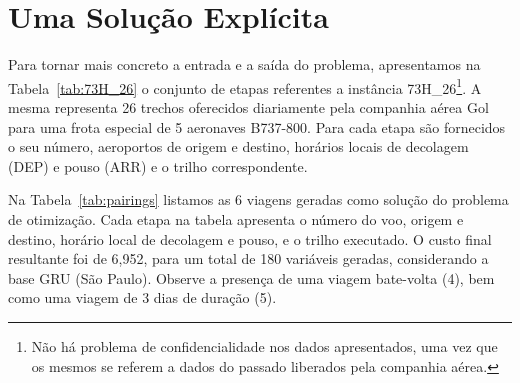
\section{Uma Solução Explícita}
\label{sec:solucao_explicita}

Para tornar mais concreto a entrada e a saída do problema, apresentamos na Tabela~\ref{tab:73H_26} o
conjunto de etapas referentes a instância 73H\_26\footnote{Não há problema de confidencialidade nos
dados apresentados, uma vez que os mesmos se referem a dados do passado liberados pela companhia
aérea.}. A mesma representa 26 trechos oferecidos diariamente pela companhia aérea Gol para uma
frota especial de 5 aeronaves B737-800. Para cada etapa são fornecidos o seu número, aeroportos de
origem e destino, horários locais de decolagem (DEP) e pouso (ARR) e o trilho
correspondente.

Na Tabela~\ref{tab:pairings} listamos as 6 viagens geradas como solução do problema de otimização.
Cada etapa na tabela apresenta o número do voo, origem e destino, horário local de decolagem e 
pouso, e o trilho executado. O custo final resultante foi de 6,952, para um total de 180 variáveis 
geradas, considerando a base GRU (São Paulo). Observe a presença de uma viagem bate-volta (4),
bem como uma viagem de 3 dias de duração (5).

